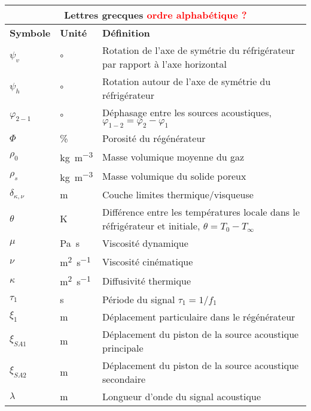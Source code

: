 \begin{center}
    \begin{longtable}{p{} p{} p{}}
        \multicolumn{3}{c}{Lettres grecques \textcolor{red}{ordre alphabétique ?}}  \\\hline
        \textbf{Symbole} & \textbf{Unité} & \textbf{Définition} \\\hline\hline
        $\psi_v$ & \unit{\degree} & Rotation de l'axe de symétrie du réfrigérateur par rapport à l'axe horizontal\\
        $\psi_h$ & \unit{\degree} & Rotation autour de l'axe de symétrie du réfrigérateur \\
        $\varphi_{2-1}$ & \unit{\degree} & Déphasage entre les sources acoustiques, $\varphi_{1-2} = \varphi_2 - \varphi_1$\\
        $\Phi$ & \unit{\percent} & Porosité du régénérateur \\
        $\rho_0$ & \unit{\kilo\gram\per\cubic\meter} & Masse volumique moyenne du gaz \\
        $\rho_{s}$ & \unit{\kilo\gram\per\cubic\meter} & Masse volumique du solide poreux\\
        $\delta_{\kappa,\nu}$ & \unit{\meter} & Couche limites thermique/visqueuse \\
        $\theta$ & \unit{\kelvin} & Différence entre les températures locale dans le réfrigérateur et initiale, $\theta=T_0-T_\infty$\\
        $\mu$ & \unit{\pascal\second} & Viscosité dynamique \\
        $\nu$ & \unit{\square\meter\per\second} & Viscosité cinématique \\
        $\kappa$ & \unit{\square\meter\per\second} & Diffusivité thermique \\
        $\tau_1$ & \unit{\second} & Période du signal $\tau_1 = 1/f_1$ \\
        $\xi_1$ & \unit{\meter} & Déplacement particulaire dans le régénérateur \\
        $\xi_{SA1}$ & \unit{\meter} & Déplacement du piston de la source acoustique principale \\
        $\xi_{SA2}$ & \unit{\meter} & Déplacement du piston de la source acoustique secondaire \\
        $\lambda$ & \unit{\meter} & Longueur d'onde du signal acoustique \\\hline
    \end{longtable}

\bigskip


\end{center}
